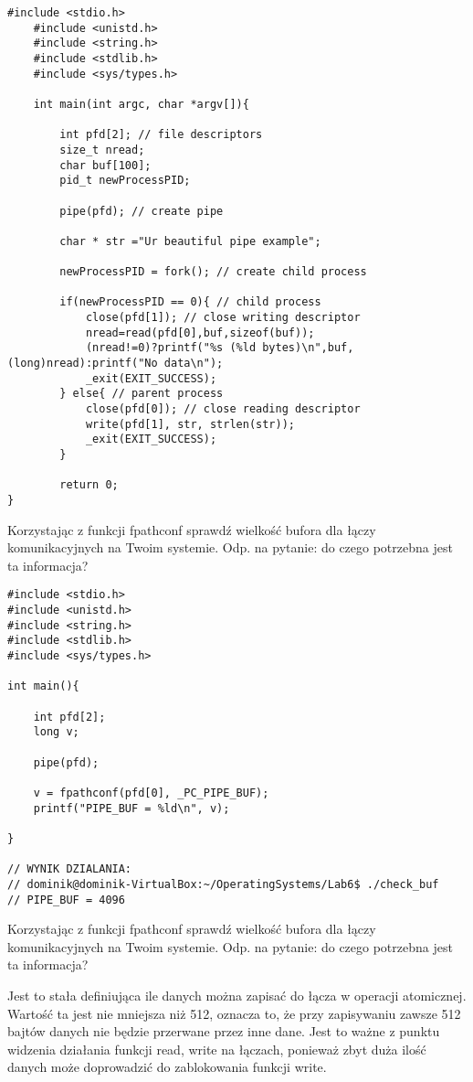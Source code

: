 \documentclass[a4paper,15pt]{article}
\newcommand{\ask}[2]{
    \begin{tcolorbox}[colback=black!5!white,colframe=gray,title={Pytanie #1}]
        #2
    \end{tcolorbox}
}
\newcommand{\assignment}[2]{
    \begin{tcolorbox}[colback=black!5!white,colframe=black,title={Zadanie #1}]
        #2
    \end{tcolorbox}
}
\begin{document}
\begin{lstlisting}[style=CStyle, label=some-code, caption=simple\_pipe.c]
    #include <stdio.h>
    #include <unistd.h>
    #include <string.h>
    #include <stdlib.h>
    #include <sys/types.h>
     
    int main(int argc, char *argv[]){
     
        int pfd[2]; // file descriptors 
        size_t nread;
        char buf[100];
        pid_t newProcessPID;

        pipe(pfd); // create pipe

        char * str ="Ur beautiful pipe example";
        
        newProcessPID = fork(); // create child process

        if(newProcessPID == 0){ // child process
            close(pfd[1]); // close writing descriptor
            nread=read(pfd[0],buf,sizeof(buf));
            (nread!=0)?printf("%s (%ld bytes)\n",buf,(long)nread):printf("No data\n");
            _exit(EXIT_SUCCESS);
        } else{ // parent process
            close(pfd[0]); // close reading descriptor
            write(pfd[1], str, strlen(str));
            _exit(EXIT_SUCCESS);
        }
     
        return 0;
}
\end{lstlisting}

\assignment{1.4}{
Korzystając z funkcji fpathconf sprawdź wielkość bufora dla łączy komunikacyjnych na Twoim systemie. Odp. na pytanie: do czego potrzebna jest ta informacja?
}
\begin{lstlisting}[style=CStyle, label=some-code, caption=zadanie1\_4.c]
#include <stdio.h>
#include <unistd.h>
#include <string.h>
#include <stdlib.h>
#include <sys/types.h>

int main(){
    
    int pfd[2];
    long v;

    pipe(pfd);

    v = fpathconf(pfd[0], _PC_PIPE_BUF);
    printf("PIPE_BUF = %ld\n", v);
    
}

// WYNIK DZIALANIA:
// dominik@dominik-VirtualBox:~/OperatingSystems/Lab6$ ./check_buf
// PIPE_BUF = 4096
\end{lstlisting}

\ask{1.4}{
Korzystając z funkcji fpathconf sprawdź wielkość bufora dla łączy komunikacyjnych na Twoim systemie. Odp. na pytanie: do czego potrzebna jest ta informacja?
}

Jest to stała definiująca ile danych można zapisać do łącza w operacji atomicznej. Wartość ta jest nie mniejsza niż 512, oznacza to, że przy zapisywaniu zawsze 512 bajtów danych nie będzie przerwane przez inne dane. Jest to ważne z punktu widzenia działania funkcji read, write na łączach, ponieważ zbyt duża ilość danych może doprowadzić do zablokowania funkcji write.
\end{document}
